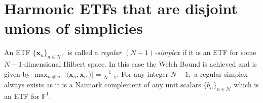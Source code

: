 \documentclass[3p,11pt]{elsarticle}
\newcommand{\bbF}{\mathbb{F}}
\newcommand{\bbZ}{\mathbb{Z}}
\newcommand{\bfx}{\mathbf{x}}
\newcommand{\calD}{\mathcal{D}}
\newcommand{\calG}{\mathcal{G}}
\newcommand{\calN}{\mathcal{N}}
\newcommand{\calU}{\mathcal{U}}
\newcommand{\abs}[1]{|{#1}|}
\newcommand{\ip}[2]{\langle{#1},{#2}\rangle}
\theoremstyle{definition}
\begin{document}




\section{Harmonic ETFs that are disjoint unions of simplicies}
An ETF $\{\bfx_n\}_{n\in\calN},$ is called a \textit{regular $(N-1)$-simplex} if it is an ETF for some $N-1$-dimensional Hilbert space. In this case the Welch Bound is achieved and is given by $\max_{n\not=n'}\abs{\ip{\bfx_n}{\bfx_{n'}}}=\tfrac{1}{N-1}.$ For any integer $N-1,$ a regular simplex always exists as it is a Naimark complement of any unit scalars $\{b_n\}_{n\in\calN}$ which is an ETF for $\bbF^1$. 
\end{document}
